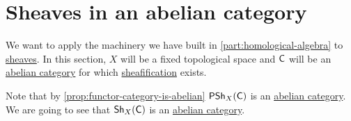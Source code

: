 \documentclass[../../main]{subfiles}
\begin{document}
\section{Sheaves in an abelian category}

We want to apply the machinery we have built in \autoref{part:homological-algebra} to \hyperref[def:sheaf]{sheaves}.
In this section, \(X\) will be a fixed topological space and \(\mathsf{C}\) will be an \hyperref[def:abelian-category]{abelian category} for which \hyperref[def:sheafification]{sheafification} exists.

Note that by \autoref{prop:functor-category-is-abelian} \(\mathsf{PSh}_{X}(\mathsf{C})\) is an \hyperref[def:abelian-category]{abelian category}.
We are going to see that \(\mathsf{Sh}_{X}(\mathsf{C})\) is an \hyperref[def:abelian-category]{abelian category}.
\end{document}
